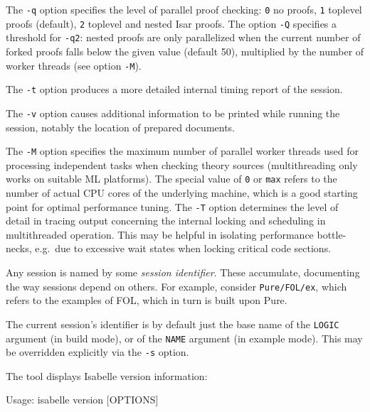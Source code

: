 \begin{isabellebody}
\begin{isamarkuptext}
  \medskip The \verb|-q| option specifies the level of parallel
  proof checking: \verb|0| no proofs, \verb|1| toplevel
  proofs (default), \verb|2| toplevel and nested Isar proofs.
  The option \verb|-Q| specifies a threshold for \verb|-q2|: nested proofs are only parallelized when the current number
  of forked proofs falls below the given value (default 50),
  multiplied by the number of worker threads (see option \verb|-M|).

  \medskip The \verb|-t| option produces a more detailed
  internal timing report of the session.

  \medskip The \verb|-v| option causes additional information
  to be printed while running the session, notably the location of
  prepared documents.

  \medskip The \verb|-M| option specifies the maximum number of
  parallel worker threads used for processing independent tasks when
  checking theory sources (multithreading only works on suitable ML
  platforms).  The special value of \verb|0| or \verb|max|
  refers to the number of actual CPU cores of the underlying machine,
  which is a good starting point for optimal performance tuning.  The
  \verb|-T| option determines the level of detail in tracing
  output concerning the internal locking and scheduling in
  multithreaded operation.  This may be helpful in isolating
  performance bottle-necks, e.g.\ due to excessive wait states when
  locking critical code sections.

  \medskip Any \hyperlink{tool.usedir}{\mbox{}} session is named by some \emph{session
  identifier}. These accumulate, documenting the way sessions depend
  on others. For example, consider \verb|Pure/FOL/ex|, which
  refers to the examples of FOL, which in turn is built upon Pure.

  The current session's identifier is by default just the base name of
  the \verb|LOGIC| argument (in build mode), or of the \verb|NAME| argument (in example mode). This may be overridden explicitly
  via the \verb|-s| option.%
\end{isamarkuptext}%
\isamarkuptrue%
%
\isamarkuptrue%
%
\begin{isamarkuptext}%
The \hypertarget{tool.version}{\hyperlink{tool.version}{\mbox{}}} tool displays Isabelle version information:
\begin{ttbox}
Usage: isabelle version [OPTIONS]


\end{ttbox}
\end{isamarkuptext}
\end{isabellebody}
